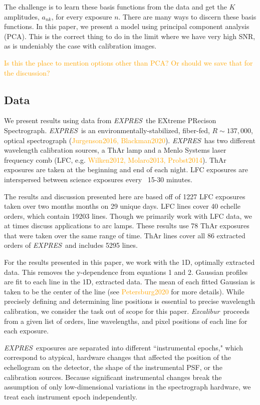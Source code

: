 \documentclass[12pt, letterpaper]{article}
\newcommand{\lz}[1]{\textcolor{orange}{#1}}
\newcommand{\project}[1]{\textsl{#1}}
\newcommand{\name}{\project{Excalibur}}
\newcommand{\acronym}[1]{{\small{#1}}}
\newcommand{\expres}{\project{\acronym{EXPRES}}}
\begin{document}
The challenge is to learn these basis functions from the data and get the $K$ amplitudes, $a_{nk}$, for every exposure $n$.  There are many ways to discern these basis functions.  In this paper, we present a model using principal component analysis (PCA).  This is the correct thing to do in the limit where we have very high SNR, as is undeniably the case with calibration images.

\lz{Is this the place to mention options other than PCA? Or should we save that for the discussion?}

\subsection{Data} \label{sec:data}
We present results using data from \expres\, the EXtreme PRecison Spectrograph.  \expres\ is an environmentally-stabilized, fiber-fed, $R\sim137,000$, optical spectrograph (\lz{Jurgenson2016, Blackman2020}).  \expres\ has two different wavelength calibration sources, a ThAr lamp and a Menlo Systems laser frequency comb (LFC, e.g. \lz{Wilken2012, Molaro2013, Probst2014}).  ThAr exposures are taken at the beginning and end of each night.  LFC exposures are interspersed between science exposures every ~15-30 minutes.

The results and discussion presented here are based off of 1227 LFC exposures taken over two months months on 29 unique days.  LFC lines cover 40 echelle orders, which contain 19203 lines.  Though we primarily work with LFC data, we at times discuss applications to arc lamps.  These results use 78 ThAr exposures that were taken over the same range of time.  ThAr lines cover all 86 extracted orders of \expres\ and includes 5295 lines.

For the results presented in this paper, we work with the 1D, optimally extracted data.  This removes the y-dependence from equations 1 and 2.  Gaussian profiles are fit to each line in the 1D, extracted data.  The mean of each fitted Gaussian is taken to be the center of the line (see \lz{Petersburg2020} for more details).  While precisely defining and determining line positions is essential to precise wavelength calibration, we consider the task out of scope for this paper.  \name\ proceeds from a given list of orders, line wavelengths, and pixel positions of each line for each exposure.

\expres\ exposures are separated into different ``instrumental epochs," which correspond to atypical, hardware changes that affected the position of the echellogram on the detector, the shape of the instrumental PSF, or the calibration sources.  Because significant instrumental changes break the assumption of only low-dimensional variations in the spectrograph hardware, we treat each instrument epoch independently.
\end{document}
